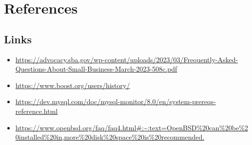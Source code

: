 \documentclass[letterpaper,12pt,oneside,listof=totoc]{scrreprt}
\begin{document}
\section{References}
\subsection{Links}
\begin{itemize}
    \item{\url{https://advocacy.sba.gov/wp-content/uploads/2023/03/Frequently-Asked-Questions-About-Small-Business-March-2023-508c.pdf}}
    \item{\url{https://www.boost.org/users/history/}}
    \item{\url{https://dev.mysql.com/doc/mysql-monitor/8.0/en/system-prereqs-reference.html}}
    \item{\url{https://www.openbsd.org/faq/faq4.html\#:\~:text=OpenBSD\%20can\%20be\%20installed\%20in,more\%20disk\%20space\%20is\%20recommended.}} 
\end{itemize}
\end{document}
